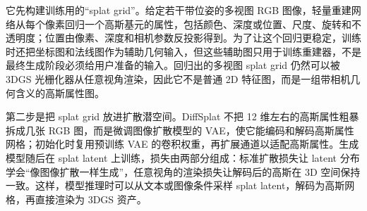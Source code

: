 它先构建训练用的“splat grid”。给定若干带位姿的多视图 RGB 图像，轻量重建网络从每个像素回归一个高斯基元的属性，包括颜色、深度或位置、尺度、旋转和不透明度；位置由像素、深度和相机参数反投影得到。为了让这个回归更稳定，训练时还把坐标图和法线图作为辅助几何输入，但这些辅助图只用于训练重建器，不是最终生成阶段必须给用户准备的输入。回归出的多视图 splat grid 仍然可以被 3DGS 光栅化器从任意视角渲染，因此它不是普通 2D 特征图，而是一组带相机几何含义的高斯属性图。

第二步是把 splat grid 放进扩散潜空间。DiffSplat 不把 12 维左右的高斯属性粗暴拆成几张 RGB 图，而是微调图像扩散模型的 VAE，使它能编码和解码高斯属性网格；初始化时复用预训练 VAE 的卷积权重，再扩展通道以适配高斯属性。生成模型随后在 splat latent 上训练，损失由两部分组成：标准扩散损失让 latent 分布学会“像图像扩散一样生成”，任意视角的渲染损失让解码后的高斯在 3D 空间保持一致。这样，模型推理时可以从文本或图像条件采样 splat latent，解码为高斯网格，再直接渲染为 3DGS 资产。

